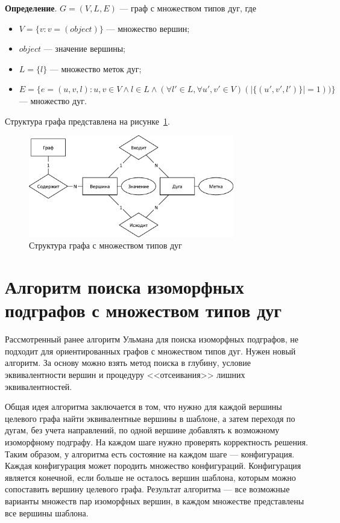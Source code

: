 \textbf{Определение}. $G = ( V, L, E )$ --- граф с множеством типов дуг, где
\begin{itemize}
\item $V = \{ v : v = (object) \}$ --- множество вершин;
\item $object$ --- значение вершины;
\item $L = \{ l \}$ --- множество меток дуг;
\item $E = \{ e = (u, v, l) :  u, v \in V \land l \in L \land ( \forall l' \in L, \forall u', v' \in V) ( | \{ (u', v', l') \} | = 1 ) ) \}$ --- множество дуг.
\end{itemize}

Структура графа представлена на рисунке~\ref{fig:graph}.

\begin{figure}[!ht]
\centering
\includegraphics[width=0.8\textwidth]{inc/graph.pdf}
\caption{Структура графа с множеством типов дуг}
\label{fig:graph}
\end{figure}

\section{Алгоритм поиска изоморфных подграфов с множеством типов дуг}

Рассмотренный ранее алгоритм Ульмана для поиска изоморфных подграфов,
не подходит для ориентированных графов с множеством типов дуг.
Нужен новый алгоритм.
За основу можно взять метод поиска в глубину, условие эквивалентности вершин
и процедуру <<отсеивания>> лишних эквивалентностей.

Общая идея алгоритма заключается в том,
что нужно для каждой вершины целевого графа найти эквивалентные вершины в шаблоне,
а затем переходя по дугам, без учета направлений,
по одной вершине добавлять к возможному изоморфному подграфу.
На каждом шаге нужно проверять корректность решения.
Таким образом, у алгоритма есть состояние на каждом шаге --- конфигурация.
Каждая конфигурация может породить множество конфигураций.
Конфигурация является конечной, если больше не осталось вершин шаблона,
которым можно сопоставить вершину целевого графа.
Результат алгоритма --- все возможные варианты множеств пар изоморфных вершин,
в каждом множестве представлены все вершины шаблона.

